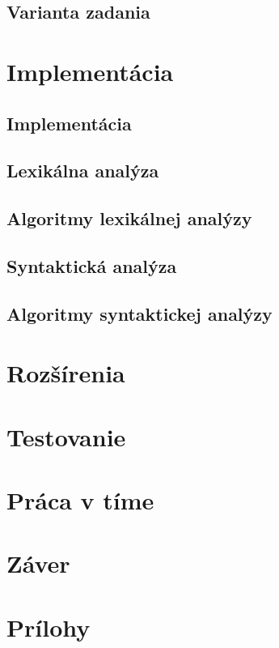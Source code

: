 \documentclass{article}
\begin{document}
    \subsection{Varianta zadania}
    
    \section{Implementácia}
    
    \subsection{Implementácia}
    \subsection{Lexikálna analýza}
    \subsection{Algoritmy lexikálnej analýzy}
    \subsection{Syntaktická analýza}
    \subsection{Algoritmy syntaktickej analýzy}
    
    \section{Rozšírenia}
    
    \section{Testovanie}
    
    \section{Práca v tíme}
    
    \section{Záver}
    
    \section{Prílohy}
\end{document}

